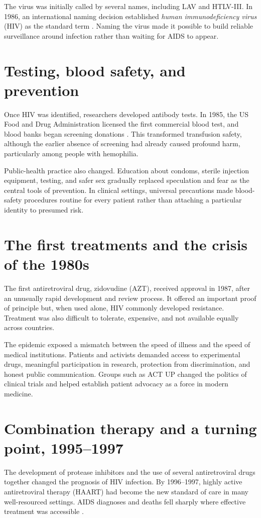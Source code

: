 \documentclass[12pt,oneside]{book}
\begin{document}
The virus was initially called by several names, including LAV and HTLV-III.
In 1986, an international naming decision established \emph{human
immunodeficiency virus} (HIV) as the standard term \cite{nlmhistory}. Naming
the virus made it possible to build reliable surveillance around infection
rather than waiting for AIDS to appear.

\section{Testing, blood safety, and prevention}
Once HIV was identified, researchers developed antibody tests. In 1985, the US
Food and Drug Administration licensed the first commercial blood test, and blood
banks began screening donations \cite{cdcmuseum}. This transformed transfusion
safety, although the earlier absence of screening had already caused profound
harm, particularly among people with hemophilia.

Public-health practice also changed. Education about condoms, sterile injection
equipment, testing, and safer sex gradually replaced speculation and fear as
the central tools of prevention. In clinical settings, universal precautions
made blood-safety procedures routine for every patient rather than attaching a
particular identity to presumed risk.

\section{The first treatments and the crisis of the 1980s}
The first antiretroviral drug, zidovudine (AZT), received approval in 1987,
after an unusually rapid development and review process. It offered an important
proof of principle but, when used alone, HIV commonly developed resistance.
Treatment was also difficult to tolerate, expensive, and not available equally
across countries.

The epidemic exposed a mismatch between the speed of illness and the speed of
medical institutions. Patients and activists demanded access to experimental
drugs, meaningful participation in research, protection from discrimination,
and honest public communication. Groups such as ACT UP changed the politics of
clinical trials and helped establish patient advocacy as a force in modern
medicine.

\section{Combination therapy and a turning point, 1995--1997}
The development of protease inhibitors and the use of several antiretroviral
drugs together changed the prognosis of HIV infection. By 1996--1997, highly
active antiretroviral therapy (HAART) had become the new standard of care in
many well-resourced settings. AIDS diagnoses and deaths fell sharply where
effective treatment was accessible \cite{cdc2001}.
\end{document}
